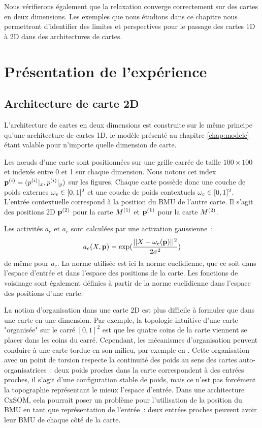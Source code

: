 \documentclass[../main]{subfiles}
\begin{document}
Nous vérifierons également que la relaxation converge correctement sur des cartes en deux dimensions.
Les exemples que nous étudions dans ce chapitre nous permettront d'identifier des limites et perspectives pour le passage des cartes 1D à 2D dans des architectures de cartes.

\section{Présentation de l'expérience}

\subsection{Architecture de carte 2D}

L'architecture de cartes en deux dimensions est construite sur le même principe qu'une architecture de cartes 1D, le modèle présenté au chapitre \ref{chap:modele} étant valable pour n'importe quelle dimension de carte.

Les n\oe{}uds d'une carte sont positionnées sur une grille carrée de taille $100 \times 100$ et indexés entre 0 et 1 sur chaque dimension. Nous notons cet index $\mathbf{p}^{({i})} = (p^{({i})}|_x, p^{({i})}|_y)$ sur les figures. 
Chaque carte possède donc une couche de poids externes $\omega_{e} \in [0,1]^2$ et une couche de poids contextuels $\omega_c \in [0,1]^2$.
L'entrée contextuelle correspond à la position du BMU de l'autre carte. Il s'agit des positions 2D $\mathbf{p}^{({2})}$ pour la carte $M^{({1})}$ et $\mathbf{p^{({1})}}$ pour la carte $M^{({2})}$. 


Les activités $a_e$ et $a_c$ sont calculées par une activation gaussienne~:
$$a_e(X,\mathbf{p}) = \exp(\frac{||X - \omega_e(\mathbf{p}) ||^2}{2\sigma^2})$$
de même pour $a_c$.
La norme utilisée est ici la norme euclidienne, que ce soit dans l'espace d'entrée et dans l'espace des positions de la carte. Les fonctions de voisinage sont également définies à partir de la norme euclidienne dans l'espace des positions d'une carte.

La notion d'organisation dans une carte 2D est plus difficile à formuler que dans une carte en une dimension.
Par exemple, la topologie intuitive d'une carte "organisée" sur le carré $[0,1]^2$ est que les quatre coins de la carte viennent se placer dans les coins du carré. Cependant, les mécanismes d'organisation peuvent conduire à une carte tordue en son milieu, par exemple en \label{fig:torsion}. 
Cette organisation avec un point de torsion respecte la continuité des poids au sens des cartes auto-organisatrices~: deux poids proches dans la carte correspondent à des entrées proches, il s'agit d'une configuration stable de poids, mais ce n'est pas forcément la topographie représentant le mieux l'espace d'entrée. 
Dans une architecture CxSOM, cela pourrait poser un problème pour l'utilisation de la position du BMU en tant que représentation de l'entrée~: deux entrées proches peuvent avoir leur BMU de chaque côté de la carte.
\end{document}
